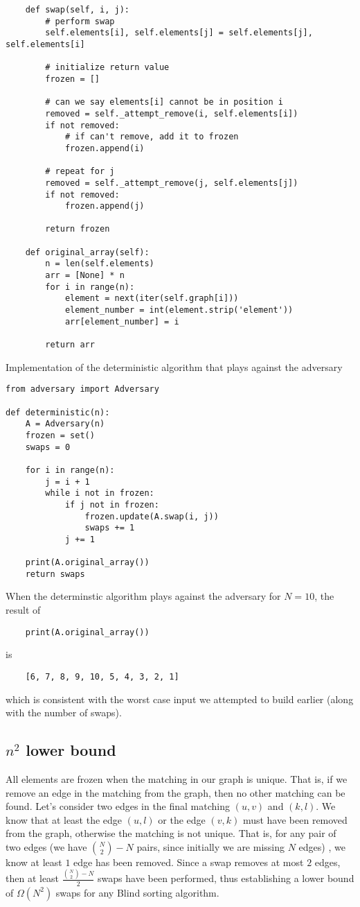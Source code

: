 \documentclass{article}
\begin{document}
\begin{verbatim}
    def swap(self, i, j):
        # perform swap
        self.elements[i], self.elements[j] = self.elements[j], self.elements[i]

        # initialize return value
        frozen = []

        # can we say elements[i] cannot be in position i
        removed = self._attempt_remove(i, self.elements[i])
        if not removed:
            # if can't remove, add it to frozen
            frozen.append(i)

        # repeat for j
        removed = self._attempt_remove(j, self.elements[j])
        if not removed:
            frozen.append(j)

        return frozen

    def original_array(self):
        n = len(self.elements)
        arr = [None] * n
        for i in range(n):
            element = next(iter(self.graph[i]))
            element_number = int(element.strip('element'))
            arr[element_number] = i

        return arr
\end{verbatim}

Implementation of the deterministic algorithm that plays against the adversary
\begin{verbatim}
from adversary import Adversary

def deterministic(n):
    A = Adversary(n)
    frozen = set()
    swaps = 0

    for i in range(n):
        j = i + 1
        while i not in frozen:
            if j not in frozen:
                frozen.update(A.swap(i, j))
                swaps += 1
            j += 1

    print(A.original_array())
    return swaps
\end{verbatim}

When the determinstic algorithm plays against the adversary for $N = 10$, the result of 
\begin{verbatim}
    print(A.original_array())
\end{verbatim}
is
\begin{verbatim}
    [6, 7, 8, 9, 10, 5, 4, 3, 2, 1]
\end{verbatim}
which is consistent with the worst case input we attempted to build earlier (along with the number of swaps).

\subsection{$n^2$ lower bound}
All elements are frozen when the matching in our graph is unique. That is, if we remove an edge
in the matching from the graph, then no other matching can be found. Let's consider two edges in the final
matching $(u, v)$ and $(k, l)$. We know that at least the edge $(u, l)$ or the edge $(v, k)$ must have been removed
from the graph, otherwise the matching is not unique. That is, for any pair of two edges (we have ${N \choose 2} - N$ pairs, since initially we are missing $N$ edges)
, we know at least $1$ edge has been removed. Since a swap removes at most $2$ edges, then at least $\frac{{N \choose 2} - N}{2}$ swaps have been performed,
thus establishing a lower bound of $\Omega(N^2)$ swaps for any Blind sorting algorithm.
\end{document}
